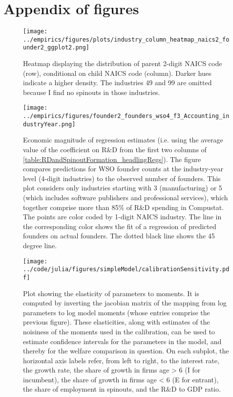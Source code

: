 \documentclass[11pt,english]{article}
\theoremstyle{definition}
\begin{document}
\newpage
\section{Appendix of figures}

\setcounter{figure}{0}
\renewcommand{\thefigure}{\Alph{section}\arabic{figure}}

\begin{figure}[!htb]
	\centering
	\texttt{[image: ../empirics/figures/plots/industry\_column\_heatmap\_naics2\_founder2\_ggplot2.png]}
	\caption{Heatmap displaying the distribution of parent 2-digit NAICS code (row), conditional on child NAICS code (column). Darker hues indicate a higher density. The industries 49 and 99 are omitted because I find no spinouts in those industries.}
	\label{figure:industry_column_heatmap_naics2_founder2}
\end{figure}

\begin{figure}[]
	\centering
	\texttt{[image: ../empirics/figures/founder2\_founders\_wso4\_f3\_Accounting\_industryYear.png]}
	\caption{Economic magnitude of regression estimates (i.e. using the average value of the coefficient on R\&D from the first two columns of \autoref{table:RDandSpinoutFormation_headlingRegs}). The figure compares predictions for WSO founder counts at the industry-year level (4-digit industries) to the observed number of founders. This plot considers only industries starting with 3 (manufacturing) or 5 (which includes software publishers and professional services), which together comprise more than 85\% of R\&D spending in Compustat. The points are color coded by 1-digit NAICS industry. The line in the corresponding color shows the fit of a regression of predicted founders on actual founders. The dotted black line shows the 45 degree line.}
	\label{figure:founder2_founders_f3_Accounting_industryYear}
\end{figure}

\begin{figure}[]
	\centering
	\texttt{[image: ../code/julia/figures/simpleModel/calibrationSensitivity.pdf]}
	\caption{Plot showing the elasticity of parameters to moments. It is computed by inverting the jacobian matrix of the mapping from log parameters to log model moments (whose entries comprise the previous figure). These elasticities, along with estimates of the noisiness of the moments used in the calibration, can be used to estimate confidence intervals for the parameters in the model, and thereby for the welfare comparison in question. On each subplot, the horizontal axis labels refer, from left to right, to the interest rate, the growth rate, the share of growth in firms age > 6 (I for incumbent), the share of growth in firms age < 6 (E for entrant), the share of employment in spinouts, and the R\&D to GDP ratio.}
	\label{calibration_sensitivity}
\end{figure}
\end{document}
